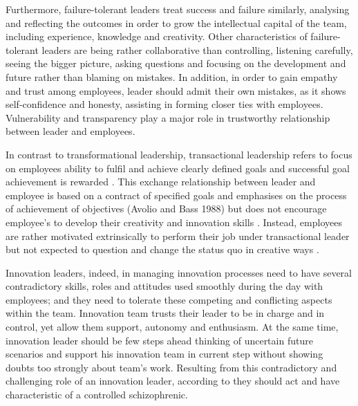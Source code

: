 Furthermore, failure-tolerant leaders treat success and failure similarly, analysing and reflecting the outcomes in order to grow the intellectual capital of the team, including experience, knowledge and creativity. Other characteristics of failure-tolerant leaders are being rather collaborative than controlling, listening carefully, seeing the bigger picture, asking questions and focusing on the development and future rather than blaming on mistakes. In addition, in order to gain empathy and trust among employees, leader should admit their own mistakes, as it shows self-confidence and honesty, assisting in forming closer ties with employees. Vulnerability and transparency play a major role in trustworthy relationship between leader and employees.  \citep{farson2002failuretolerantleader}

In contrast to transformational leadership, transactional leadership refers to focus on employees ability to fulfil and achieve clearly defined goals \citep{hollander1978leadership,house1971path} and successful goal achievement is rewarded \citep{waldman1990adding}. This exchange relationship between leader and employee is based on a contract of specified goals and emphasises on the process of achievement of objectives (Avolio and Bass 1988) but does not encourage employee's to develop their creativity and innovation skills \citep{jung2001transformational}. Instead, employees are rather motivated extrinsically to perform their job under transactional leader but not expected to question and change the status quo in creative ways \citep{amabile1998kill}.  

Innovation leaders, indeed, in managing innovation processes need to have several contradictory skills, roles and attitudes used smoothly during the day with employees; and they need to tolerate these competing and conflicting aspects within the team. Innovation team trusts their leader to be in charge and in control, yet allow them support, autonomy and enthusiasm.  At the same time, innovation leader should be few steps ahead thinking of uncertain future scenarios and support his innovation team in current step without showing doubts too strongly about team's work. \citep{buijs2007innovation} Resulting from this contradictory and challenging role of an innovation leader, according to \citet{buijs2007innovation} they should act and have characteristic of a controlled schizophrenic. 

